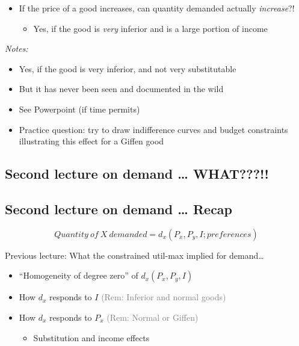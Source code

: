 \documentclass[]{article}
\providecommand{\tightlist}{%
  \setlength{\itemsep}{0pt}\setlength{\parskip}{0pt}}
\begin{document}
\begin{itemize}
\tightlist
\item
  If the price of a good increases, can quantity demanded actually \emph{increase}?!

  \begin{itemize}
  \tightlist
  \item
    Yes, if the good is \emph{very} inferior and is a large portion of income
  \end{itemize}
\end{itemize}

\emph{Notes:}

\begin{itemize}
\tightlist
\item
  Yes, if the good is very inferior, and not very substitutable\\
\item
  But it has never been seen and documented in the wild\\
\item
  See Powerpoint (if time permits)\\
\item
  Practice question: try to draw indifference curves and budget constraints illustrating this effect for a Giffen good
\end{itemize}

\hypertarget{second-lecture-on-demand-what}{%
\subsection{Second lecture on demand \ldots{} WHAT???!!}\label{second-lecture-on-demand-what}}

\hypertarget{second-lecture-on-demand-recap}{%
\subsection{Second lecture on demand \ldots{} Recap}\label{second-lecture-on-demand-recap}}

\[Quantity \: of \: X \: demanded = d_x(P_x, P_y, I; preferences)\]

\bigskip

Previous lecture: What the constrained util-max implied for demand\ldots{}

\begin{itemize}
\item
  ``Homogeneity of degree zero'' of \(d_x(P_x, P_y, I)\)
\item
  How \(d_x\) responds to \(I\) \textcolor{gray}{(Rem: Inferior and normal goods)}
\item
  How \(d_x\) responds to \(P_x\) \textcolor{gray}{(Rem: Normal or Giffen)}

  \begin{itemize}
  \tightlist
  \item
    Substitution and income effects
  \end{itemize}
\end{itemize}
\end{document}
